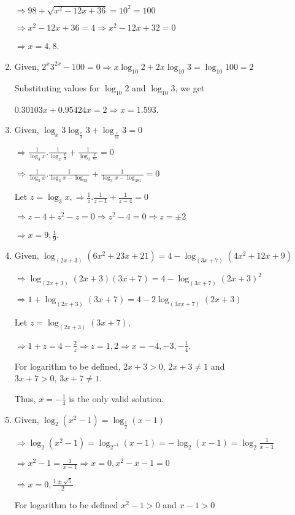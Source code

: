 \begin{enumerate}
  $\Rightarrow 98 + \sqrt{x^2 - 12x + 36} = 10^2 = 100$

  $\Rightarrow x^2 - 12x + 36 = 4 \Rightarrow x^2 - 12x + 32 = 0$

  $\Rightarrow x = 4, 8$.
\item Given, $2^x3^{2x} - 100 = 0 \Rightarrow x\log_{10}2 + 2x\log_{10}3 = \log_{10}100 = 2$

  Substituting values for $\log_{10}2$ and $\log_{10}3$, we get

  $0.30103x + 0.95424x = 2 \Rightarrow x = 1.593$.
\item Given, $\log_x3\log_{\tfrac{x}{3}}3 + \log_{\tfrac{x}{81}}3 = 0$

  $\Rightarrow \frac{1}{\log_3x}.\frac{1}{\log_x\tfrac{x}{3}} + \frac{1}{\log_3\tfrac{x}{81}} = 0$

  $\Rightarrow \frac{1}{\log_3x}.\frac{1}{\log_3x - \log_33} + \frac{1}{\log_3x - \log_381} = 0$

  Let $z = \log_3x, \Rightarrow \frac{1}{z}.\frac{1}{z - 1} + \frac{1}{z - 4} = 0$

  $\Rightarrow z - 4 + z^2 - z = 0 \Rightarrow z^2 - 4 = 0 \Rightarrow z = \pm 2$

  $\Rightarrow x = 9, \frac{1}{9}$.
\item Given, $\log_{(2x + 3)}(6x^2 + 23x + 21) = 4 - \log_{(3x + 7)}(4x^2 + 12x + 9)$

  $\Rightarrow \log_{(2x + 3)}(2x + 3)(3x + 7) = 4 - \log_{(3x + 7)}(2x + 3)^2$

  $\Rightarrow 1 + \log_{(2x + 3)}(3x + 7) = 4 - 2\log_{(3xx + 7)}(2x + 3)$

  Let $z = \log_{(2x + 3)}(3x + 7)$,

  $\Rightarrow 1 + z = 4 - \frac{2}{z}\Rightarrow z = 1, 2 \Rightarrow x = -4, -3, -\frac{1}{4}$.

  For logarithm to be defined, $2x + 3 > 0,\,2x + 3\neq 1$ and $3x + 7 > 0,\,3x + 7 \neq 1$.

  Thus, $x = -\frac{1}{4}$ is the only valid solution.
\item Given, $\log_2(x^2 - 1) = \log_{\tfrac{1}{2}}(x - 1)$

  $\Rightarrow \log_2(x^2 - 1) = \log_{2^{-1}}(x - 1) = -\log_2(x - 1) = \log_2\frac{1}{x - 1}$

  $\Rightarrow x^2 - 1 = \frac{1}{x - 1}\Rightarrow x = 0, x^2 - x - 1 = 0$

  $\Rightarrow x = 0, \frac{1\pm\sqrt{5}}{2}$

  For logarithm to be defined $x^2 - 1 > 0$ and $x - 1 > 0$


\end{enumerate}
